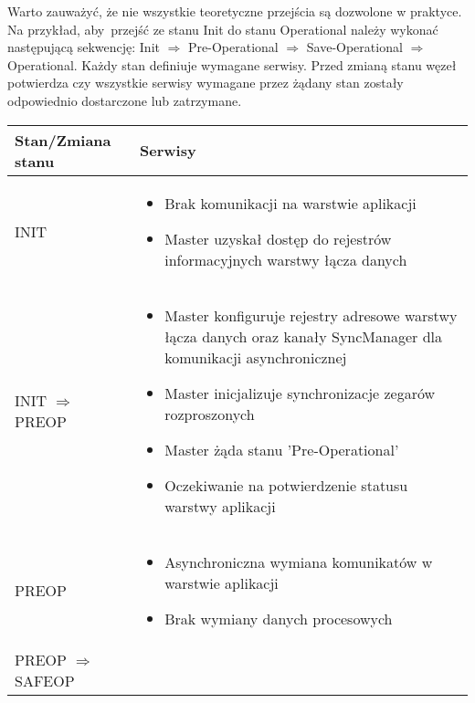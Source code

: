 Warto zauważyć, że nie wszystkie teoretyczne przejścia są dozwolone w praktyce. Na przykład, aby~przejść ze stanu Init do stanu Operational należy wykonać następującą sekwencję: Init $\Rightarrow$ Pre-Operational $\Rightarrow$ Save-Operational $\Rightarrow$ Operational.
Każdy stan definiuje wymagane serwisy. Przed zmianą stanu węzeł potwierdza czy wszystkie serwisy wymagane przez żądany stan zostały odpowiednio dostarczone lub zatrzymane.

\begin{table}[!htb]
\begin{center}
\begin{tabular}{| p{} | p{} |}\hline
\textbf{Stan/Zmiana stanu} & \textbf{Serwisy}\\\hline\hline
INIT & \begin{itemize} \setlength{\itemsep}{0pt} \setlength{\parskip}{0pt} \setlength{\parsep}{0pt} \setlength{\topsep}{0pt}
\item Brak komunikacji na warstwie aplikacji
\item Master uzyskał dostęp do rejestrów informacyjnych warstwy łącza danych
\end{itemize} \\\hline
INIT $\Rightarrow$ PREOP & \begin{itemize} \setlength{\itemsep}{0pt} \setlength{\parskip}{0pt} \setlength{\parsep}{0pt} \setlength{\topsep}{0pt}
\item Master konfiguruje rejestry adresowe warstwy łącza danych oraz kanały SyncManager dla komunikacji asynchronicznej
\item Master inicjalizuje synchronizacje zegarów rozproszonych
\item Master żąda stanu 'Pre-Operational'
\item Oczekiwanie na potwierdzenie statusu warstwy aplikacji
\end{itemize}\\\hline
PREOP & \begin{itemize} \setlength{\itemsep}{0pt} \setlength{\parskip}{0pt} \setlength{\parsep}{0pt} \setlength{\topsep}{0pt}
\item Asynchroniczna wymiana komunikatów w warstwie aplikacji
\item Brak wymiany danych procesowych
\end{itemize}\\\hline
PREOP $\Rightarrow$ SAFEOP & \begin{itemize} \setlength{\itemsep}{0pt} \setlength{\parskip}{0pt} \setlength{\parsep}{0pt} \setlength{\topsep}{0pt}

\end{itemize}
\end{tabular}
\end{center}
\end{table}
